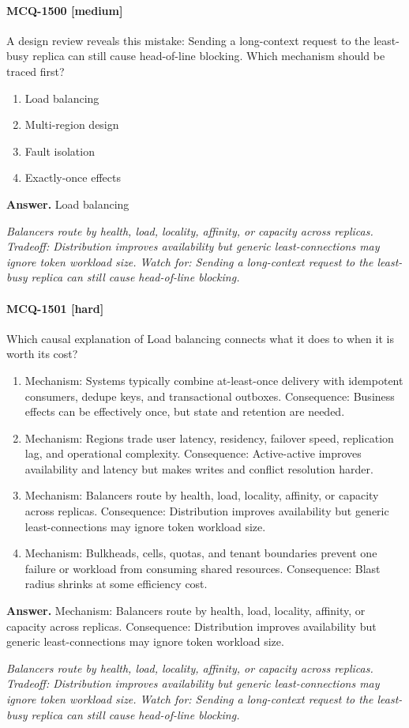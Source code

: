 \paragraph{MCQ-1500 [medium]} A design review reveals this mistake: Sending a long-context request to the least-busy replica can still cause head-of-line blocking. Which mechanism should be traced first?
\begin{enumerate}[label=\Alph*.]
\item Load balancing
\item Multi-region design
\item Fault isolation
\item Exactly-once effects
\end{enumerate}
\noindent\textbf{Answer.} Load balancing
\par\textit{Balancers route by health, load, locality, affinity, or capacity across replicas. Tradeoff: Distribution improves availability but generic least-connections may ignore token workload size. Watch for: Sending a long-context request to the least-busy replica can still cause head-of-line blocking.}
\paragraph{MCQ-1501 [hard]} Which causal explanation of Load balancing connects what it does to when it is worth its cost?
\begin{enumerate}[label=\Alph*.]
\item Mechanism: Systems typically combine at-least-once delivery with idempotent consumers, dedupe keys, and transactional outboxes. Consequence: Business effects can be effectively once, but state and retention are needed.
\item Mechanism: Regions trade user latency, residency, failover speed, replication lag, and operational complexity. Consequence: Active-active improves availability and latency but makes writes and conflict resolution harder.
\item Mechanism: Balancers route by health, load, locality, affinity, or capacity across replicas. Consequence: Distribution improves availability but generic least-connections may ignore token workload size.
\item Mechanism: Bulkheads, cells, quotas, and tenant boundaries prevent one failure or workload from consuming shared resources. Consequence: Blast radius shrinks at some efficiency cost.
\end{enumerate}
\noindent\textbf{Answer.} Mechanism: Balancers route by health, load, locality, affinity, or capacity across replicas. Consequence: Distribution improves availability but generic least-connections may ignore token workload size.
\par\textit{Balancers route by health, load, locality, affinity, or capacity across replicas. Tradeoff: Distribution improves availability but generic least-connections may ignore token workload size. Watch for: Sending a long-context request to the least-busy replica can still cause head-of-line blocking.}
